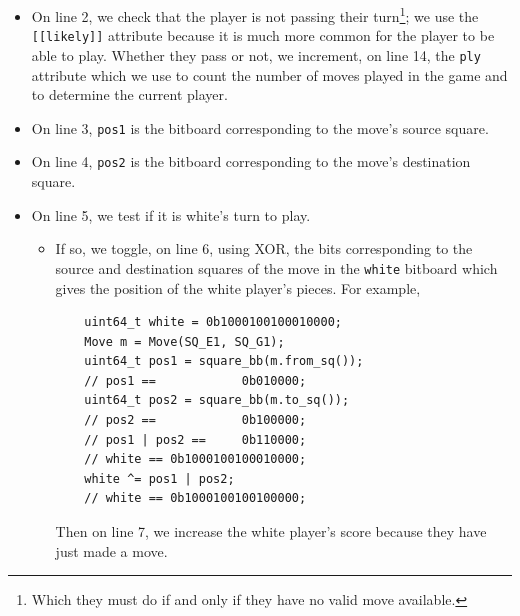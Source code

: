 \documentclass[12pt,a4paper,twoside,openright]{book}
\begin{document}
\begin{itemize}
\item On line 2, we check that the player is not passing their turn\footnote{Which they must do if and only if they have no valid move available.}; we use the \texttt{[[likely]]} attribute because it is much more common for the player to be able to play. Whether they pass or not, we increment, on line 14, the \texttt{ply} attribute which we use to count the number of moves played in the game and to determine the current player.

\item On line 3, \texttt{pos1} is the bitboard corresponding to the move's source square.

\item On line 4, \texttt{pos2} is the bitboard corresponding to the move's destination square.

\item On line 5, we test if it is white's turn to play.
\begin{itemize}
\item If so, we toggle, on line 6, using XOR, the bits corresponding to the source and destination squares of the move in the \texttt{white} bitboard which gives the position of the white player's pieces. For example,
\begin{verbatim}
    uint64_t white = 0b1000100100010000;
    Move m = Move(SQ_E1, SQ_G1);
    uint64_t pos1 = square_bb(m.from_sq());
    // pos1 ==            0b010000;
    uint64_t pos2 = square_bb(m.to_sq());
    // pos2 ==            0b100000;
    // pos1 | pos2 ==     0b110000;
    // white == 0b1000100100010000;
    white ^= pos1 | pos2;
    // white == 0b1000100100100000;
\end{verbatim}
Then on line 7, we increase the white player's score because they have just made a move.


\end{itemize}
\end{itemize}
\end{document}
